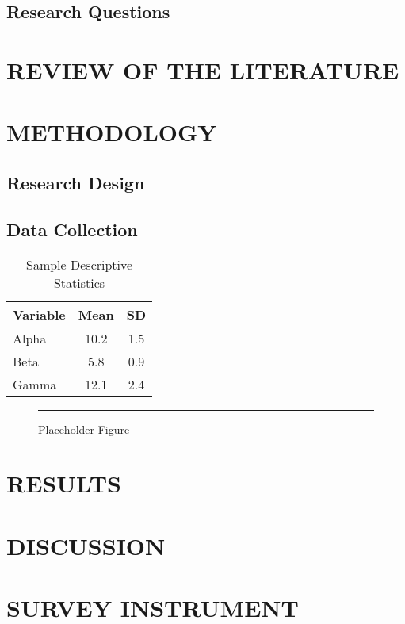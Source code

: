 \documentclass[12pt,oneside]{book}
\begin{document}
\section{Research Questions}
\lipsum[4]

\chapter{REVIEW OF THE LITERATURE}
\lipsum[5-6]

\chapter{METHODOLOGY}
\section{Research Design}
\lipsum[7]

\section{Data Collection}
\lipsum[8]

\begin{table}[ht]
\centering
\caption{Sample Descriptive Statistics}
\begin{tabular}{lcc}
\hline
Variable & Mean & SD \\
\hline
Alpha & 10.2 & 1.5\\
Beta & 5.8 & 0.9\\
Gamma & 12.1 & 2.4\\
\hline
\end{tabular}
\end{table}

\begin{figure}[ht]
\centering
\caption{Placeholder Figure}
\rule{3in}{1.5in} %
\end{figure}

\chapter{RESULTS}
\lipsum[9-10]

\chapter{DISCUSSION}
\lipsum[11-12]

\appendix
\chapter{SURVEY INSTRUMENT}
\lipsum[13]
\end{document}

